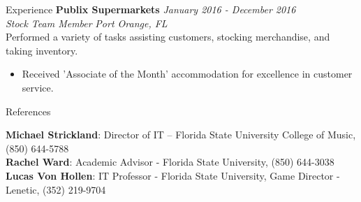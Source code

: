 \documentclass{resume} %
\begin{document}
\begin{rSection}{Experience}
		{\bf Publix Supermarkets} \hfill {\em January 2016 - December 2016}\\
		\textit{Stock Team Member} \hfill {\em Port Orange, FL} \smallskip \\
		Performed a variety of tasks assisting customers, stocking merchandise, and taking inventory.
		\begin{itemize}
			\vspace{-0.2cm} \item Received 'Associate of the Month' accommodation for excellence in customer service.
		\end{itemize}
		
	\end{rSection}
	
	\begin{rSection}{References}
		
		\textbf{Michael Strickland}: Director of IT – Florida State University College of Music, (850) 644-5788 \\
		\textbf{Rachel Ward}: Academic Advisor - Florida State University, (850) 644-3038  \\
		\textbf{Lucas Von Hollen}: 	IT Professor - Florida State University, Game Director - Lenetic, (352) 219-9704
		
		
		
		
		
	\end{rSection}
	
	
	
		
		
	
	
\end{document}
